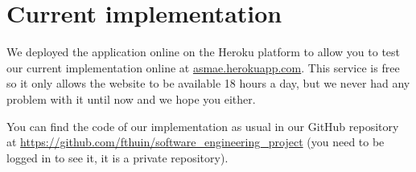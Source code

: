 \section{Current implementation}

We deployed the application online on the Heroku platform to allow you to
test our current implementation online at \url{asmae.herokuapp.com}. This
service is free so it only allows the website to be available 18 hours a
day, but we never had any problem with it until now and we hope you
either.\newline

You can find the code of our implementation as usual in our GitHub
repository at \url{https://github.com/fthuin/software_engineering_project}
(you need to be logged in to see it, it is a private repository).

